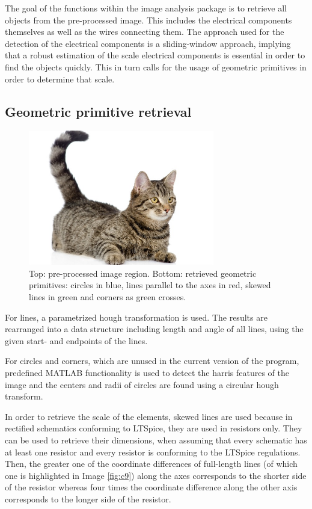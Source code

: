 \documentclass[10pt,twocolumn,letterpaper]{article}
\begin{document}
The goal of the functions within the image analysis package is to retrieve all objects from the pre-processed image. This includes the electrical components themselves as well as the wires connecting them. The approach used for the detection of the electrical components is a sliding-window approach, implying that a robust estimation of the scale electrical components is essential in order to find the objects quickly. This in turn calls for the usage of geometric primitives in order to determine that scale.

\subsection{Geometric primitive retrieval}
\label{subsec:geom}

\begin{figure}[!ht]
\includegraphics[width = 3.2in]{img/cat.jpg}
\caption{Top: pre-processed image region. Bottom: retrieved geometric primitives: circles in blue, lines parallel to the axes in red, skewed lines in green and corners as green crosses.}
\label{fig:c8}
\end{figure}
\par

For lines, a parametrized hough transformation is used. The results are rearranged into a data structure including length and angle of all lines, using the given start- and endpoints of the lines.
\par
For circles and corners, which are unused in the current version of the program, predefined MATLAB functionality is used to detect the harris features of the image and the centers and radii of circles are found using a circular hough transform.
\par
In order to retrieve the scale of the elements, skewed lines are used because in rectified schematics conforming to LTSpice, they are used in resistors only. They can be used to retrieve their dimensions, when assuming that every schematic has at least one resistor and every resistor is conforming to the LTSpice regulations. Then, the greater one of the coordinate differences of full-length lines (of which one is highlighted in Image \ref{fig:c9}) along the axes corresponds to the shorter side of the resistor whereas four times the coordinate difference along the other axis corresponds to the longer side of the resistor.
\par
\end{document}
